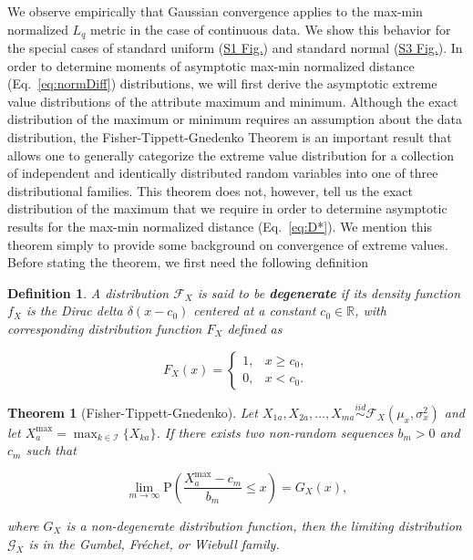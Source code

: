 \documentclass[10pt,letterpaper]{article}
\newtheorem{theorem}{Theorem}[section]
\newtheorem{definition}{Definition}[section]
\begin{document}
We observe empirically that Gaussian convergence applies to the max-min normalized $L_q$ metric in the case of continuous data. We show this behavior for the special cases of standard uniform (\hyperlink{S1_Fig}{S1 Fig.}) and standard normal (\hyperlink{S3_Fig}{S3 Fig.}). In order to determine moments of asymptotic max-min normalized distance (Eq.~\ref{eq:normDiff}) distributions, we will first derive the asymptotic extreme value distributions of the attribute maximum and minimum. Although the exact distribution of the maximum or minimum requires an assumption about the data distribution, the Fisher-Tippett-Gnedenko Theorem is an important result that allows one to generally categorize the extreme value distribution for a collection of independent and identically distributed random variables into one of three distributional families. This theorem does not, however, tell us the exact distribution of the maximum that we require in order to determine asymptotic results for the max-min normalized distance (Eq.~\ref{eq:D*}). We mention this theorem simply to provide some background on convergence of extreme values. Before stating the theorem, we first need the following definition
%
\begin{definition}
	A distribution $\mathcal{F}_X$ is said to be \textbf{degenerate} if its density function $f_X$ is the Dirac delta $\delta(x - c_0)$ centered at a constant $c_0 \in \mathbb{R}$, with corresponding distribution function $F_X$ defined as
	
	\[F_X(x)=\begin{cases}
	1, & x \geq c_0, \\
	0, & x < c_0.
	\end{cases}
	\]
\end{definition}
%
\begin{theorem}[Fisher-Tippett-Gnedenko]\label{thm:EVT}
	Let $X_{1a},X_{2a},\dots,X_{ma} \overset{iid}{\sim} \mathcal{F}_X\left(\mu_x,\sigma^2_x\right)$ and let $X^\text{max}_a = \displaystyle \max_{k \in \mathcal{I}}\{X_{ka}\}$. If there exists two non-random sequences $b_m>0$ and $c_m$ such that
	
	\[\lim_{m \to \infty} \text{P}\left(\frac{X^\text{max}_a - c_m}{b_m} \leq x\right) = G_X(x),\]
	
	\noindent where $G_X$ is a non-degenerate distribution function, then the limiting distribution $\mathcal{G}_X$ is in the Gumbel, Fr\'{e}chet, or Wiebull family.
\end{theorem}
\end{document}
